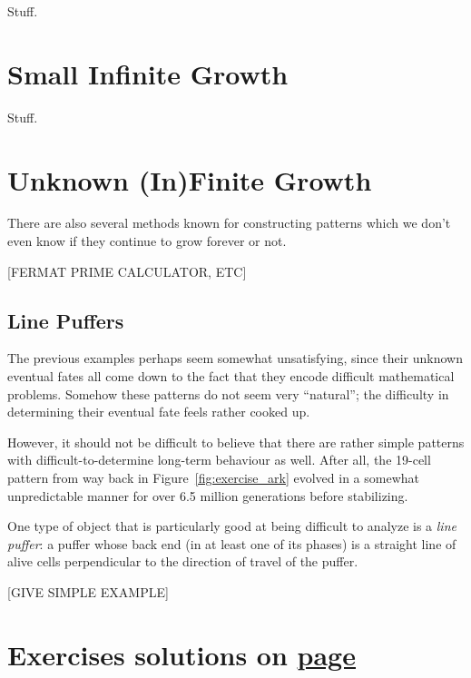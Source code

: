 Stuff.


\section{Small Infinite Growth}\label{sec:small_infinite_growth}

Stuff.


\section{Unknown (In)Finite Growth}\label{sec:unknown_growth}

There are also several methods known for constructing patterns which we don't even know if they continue to grow forever or not.

[FERMAT PRIME CALCULATOR, ETC]


\subsection{Line Puffers}\label{sec:line_puffers}

The previous examples perhaps seem somewhat unsatisfying, since their unknown eventual fates all come down to the fact that they encode difficult mathematical problems. Somehow these patterns do not seem very ``natural''; the difficulty in determining their eventual fate feels rather cooked up.

However, it should not be difficult to believe that there are rather simple patterns with difficult-to-determine long-term behaviour as well. After all, the 19-cell pattern from way back in Figure~\ref{fig:exercise_ark} evolved in a somewhat unpredictable manner for over 6.5 million generations before stabilizing.

One type of object that is particularly good at being difficult to analyze is a \emph{line puffer}: a puffer whose back end (in at least one of its phases) is a straight line of alive cells perpendicular to the direction of travel of the puffer.

[GIVE SIMPLE EXAMPLE]


\section*{Exercises \hfill \normalfont\textsf{\small solutions on \hyperlink{solutions_infinite_growth}{page \pageref{solutions_infinite_growth}}}}

